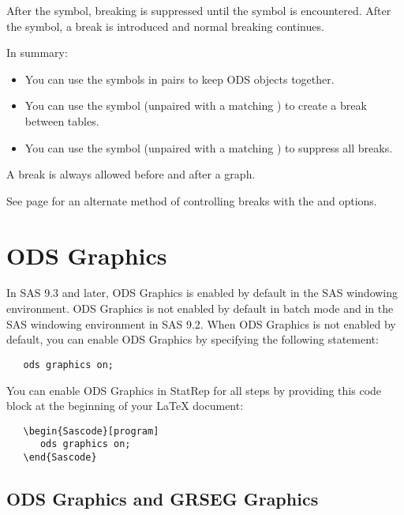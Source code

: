 \documentclass[article,oneside]{memoir}
\newcommand*{\StatRep}{\textsf{StatRep}\xspace}
\begin{document}
  After the \Code{<} symbol, breaking is suppressed until the \Code{>} symbol is encountered.
  After the \Code{>} symbol, a break is introduced and normal breaking continues.

  In summary:
  \begin{itemize}
  \item You can use the \Code{<>} symbols in pairs to keep ODS objects together.
  \item You can use the \Code{>} symbol (unpaired with a matching \Code{<}) to create a break between tables.
  \item You can use the \Code{<} symbol (unpaired with a matching \Code{>}) to suppress all breaks.
  \end{itemize}

  A break is always allowed before and after a graph.

  See page \pageref{skiplast} for an alternate method of controlling breaks
  with the  and  options.

 \section{ODS Graphics}

 In SAS 9.3 and later, ODS Graphics is enabled by default in the SAS windowing environment.
 ODS Graphics is not enabled by default in batch mode and in the SAS windowing environment in SAS 9.2.
 When ODS Graphics is not enabled by default, you can enable ODS Graphics by specifying the following statement:

\begin{snugshade}
\begin{verbatim}
   ods graphics on;
\end{verbatim}
\end{snugshade}


You can enable ODS Graphics in \StatRep for all steps by providing this code block at the
beginning of your LaTeX document:

\begin{snugshade}
\begin{verbatim}
   \begin{Sascode}[program]
      ods graphics on;
   \end{Sascode}
\end{verbatim}
\end{snugshade}

 \subsection{ODS Graphics and GRSEG Graphics}
 \label{grseg}
\end{document}
